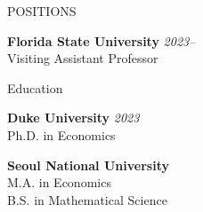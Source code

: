 


\medskip
\address{P.O. Box 3062160, 113 Collegiate Loop, Tallahassee, Florida, 32306-2160}  %

\address{ \href{mailto:ykim22@fsu.edu}{ykim22@fsu.edu} \\ \href{https://sites.google.com/view/yonggyun-yg-kim/}{https://sites.google.com/view/yonggyun-yg-kim} } %
\address{Department of Economics	Florida State University}  %






\begin{rSection}{POSITIONS}
	
	{\bf Florida State University} \hfill 
	{\em 2023--} 
	\\ 
	Visiting Assistant Professor \smallskip
	
	
\end{rSection}



\medskip



\begin{rSection}{Education}
	
	{\bf Duke University} \hfill 
	{\em 2023 } 
	\\ 
	Ph.D. in Economics \smallskip
	
	
	{\bf Seoul National University} \hfill 
	\\
	M.A. in Economics
	\\
	B.S. in Mathematical Science
	
\end{rSection}



